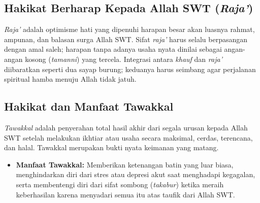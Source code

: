 \documentclass[12pt, a4paper]{article}
\begin{document}
\subsection{Hakikat Berharap Kepada Allah SWT (\textit{Raja'})}
\textit{Raja'} adalah optimisme hati yang dipenuhi harapan besar akan luasnya rahmat, ampunan, dan balasan surga Allah SWT. Sifat \textit{raja'} harus selalu berpasangan dengan amal saleh; harapan tanpa adanya usaha nyata dinilai sebagai angan-angan kosong (\textit{tamanni}) yang tercela. Integrasi antara \textit{khauf} dan \textit{raja'} diibaratkan seperti dua sayap burung; keduanya harus seimbang agar perjalanan spiritual hamba menuju Allah tidak jatuh.

\subsection{Hakikat dan Manfaat Tawakkal}
\textit{Tawakkal} adalah penyerahan total hasil akhir dari segala urusan kepada Allah SWT setelah melakukan ikhtiar atau usaha secara maksimal, cerdas, terencana, dan halal. Tawakkal merupakan bukti nyata keimanan yang matang.
\begin{itemize}
    \item \textbf{Manfaat Tawakkal:} Memberikan ketenangan batin yang luar biasa, menghindarkan diri dari stres atau depresi akut saat menghadapi kegagalan, serta membentengi diri dari sifat sombong (\textit{takabur}) ketika meraih keberhasilan karena menyadari semua itu atas taufik dari Allah SWT.
\end{itemize}
\end{document}
